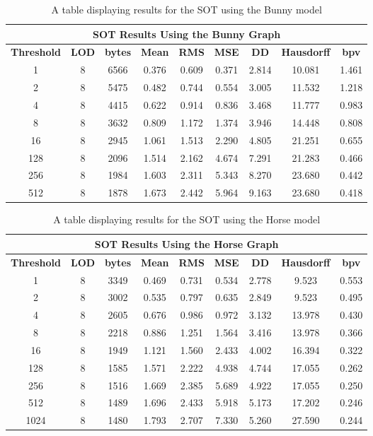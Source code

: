 \begin{table}[h]
\begin{tabular}[c]{|c|c|c|c|c|c|c|c|c|}
\hline\multicolumn{9}{|c|}{\textbf{SOT Results Using the Bunny Graph}}\\
\hline
\textbf{Threshold} & \textbf{LOD} & \textbf{bytes} & \textbf{Mean} & \textbf{RMS} & \textbf{MSE} & \textbf{DD} & \textbf{Hausdorff} & \textbf{bpv}\\
\hline
1 & 8 & 6566 & 0.376 & 0.609 & 0.371 & 2.814 & 10.081 & 1.461\\
\hline
2 & 8 & 5475 & 0.482 & 0.744 & 0.554 & 3.005 & 11.532 & 1.218\\
\hline
4 & 8 & 4415 & 0.622 & 0.914 & 0.836 & 3.468 & 11.777 & 0.983\\
\hline
8 & 8 & 3632 & 0.809 & 1.172 & 1.374 & 3.946 & 14.448 & 0.808\\
\hline
16 & 8 & 2945 & 1.061 & 1.513 & 2.290 & 4.805 & 21.251 & 0.655\\
\hline
128 & 8 & 2096 & 1.514 & 2.162 & 4.674 & 7.291 & 21.283 & 0.466\\
\hline
256 & 8 & 1984 & 1.603 & 2.311 & 5.343 & 8.270 & 23.680 & 0.442\\
\hline
512 & 8 & 1878 & 1.673 & 2.442 & 5.964 & 9.163 & 23.680 & 0.418\\
\hline
\end{tabular}
\caption{A table displaying results for the SOT using the Bunny model}
\label{table:SOTTableBunny}
\end{table}

\begin{table}[h]
\begin{tabular}[c]{|c|c|c|c|c|c|c|c|c|}
\hline\multicolumn{9}{|c|}{\textbf{SOT Results Using the Horse Graph}}\\
\hline
\textbf{Threshold} & \textbf{LOD} & \textbf{bytes} & \textbf{Mean} & \textbf{RMS} & \textbf{MSE} & \textbf{DD} & \textbf{Hausdorff} & \textbf{bpv}\\
\hline
1 & 8 & 3349 & 0.469 & 0.731 & 0.534 & 2.778 & 9.523 & 0.553\\
\hline
2 & 8 & 3002 & 0.535 & 0.797 & 0.635 & 2.849 & 9.523 & 0.495\\
\hline
4 & 8 & 2605 & 0.676 & 0.986 & 0.972 & 3.132 & 13.978 & 0.430\\
\hline
8 & 8 & 2218 & 0.886 & 1.251 & 1.564 & 3.416 & 13.978 & 0.366\\
\hline
16 & 8 & 1949 & 1.121 & 1.560 & 2.433 & 4.002 & 16.394 & 0.322\\
\hline
128 & 8 & 1585 & 1.571 & 2.222 & 4.938 & 4.744 & 17.055 & 0.262\\
\hline
256 & 8 & 1516 & 1.669 & 2.385 & 5.689 & 4.922 & 17.055 & 0.250\\
\hline
512 & 8 & 1489 & 1.696 & 2.433 & 5.918 & 5.173 & 17.202 & 0.246\\
\hline
1024 & 8 & 1480 & 1.793 & 2.707 & 7.330 & 5.260 & 27.590 & 0.244\\
\hline
\end{tabular}
\caption{A table displaying results for the SOT using the Horse model}
\label{table:SOTTableHorse}
\end{table}

